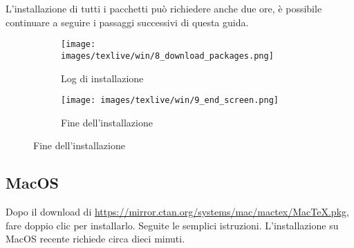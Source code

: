 \documentclass[envcountsame,envcountchap]{svmono}
\begin{document}
L'installazione di tutti i pacchetti può richiedere anche due ore, è possibile continuare a seguire i passaggi successivi di questa guida.
\begin{figure}[H]
    \begin{subfigure}{0.49\textwidth}
        \centering
        \texttt{[image: images/texlive/win/8\_download\_packages.png]}
        \caption{Log di installazione}
        \label{texlive_install_log}
    \end{subfigure}
    \begin{subfigure}{0.49\textwidth}
        \centering
        \texttt{[image: images/texlive/win/9\_end\_screen.png]}
        \caption{Fine dell'installazione}
        \label{texlive_installato}
    \end{subfigure}
\end{figure}

\label{esempio_citazione}
\subsection{MacOS \citep{installMacTeX}}
Dopo il download di \url{https://mirror.ctan.org/systems/mac/mactex/MacTeX.pkg}, 
fare doppio clic per installarlo. Seguite le semplici istruzioni. 
L'installazione su MacOS recente richiede circa dieci minuti.
\end{document}
